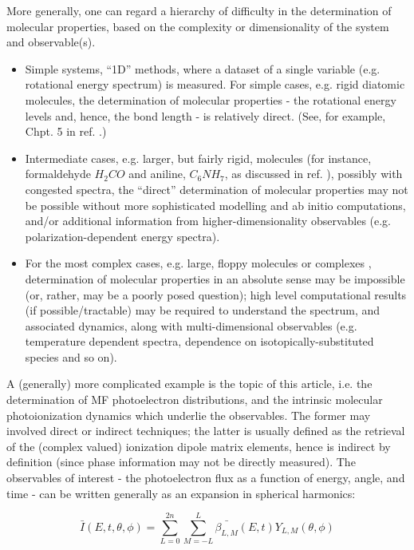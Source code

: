
More generally, one can regard a hierarchy of difficulty in the determination of molecular properties, based on the complexity or dimensionality of the system and observable(s).
\begin{itemize}
\item Simple systems, ``1D” methods, where a dataset of a single variable (e.g. rotational energy spectrum) is measured. For simple cases, e.g. rigid diatomic molecules, the determination of molecular properties - the rotational energy levels and, hence, the bond length - is relatively direct. (See, for example, Chpt. 5 in ref. \cite{hollasHighRes}.) %
\item Intermediate cases, e.g. larger, but fairly rigid, molecules (for instance, formaldehyde $H_2CO$ and aniline, $C_6NH_7$, as discussed in ref. \cite{hollasHighRes}), possibly with congested spectra, the ``direct” determination of molecular properties may not be possible without more sophisticated modelling and ab initio computations, and/or additional information from higher-dimensionality observables (e.g. polarization-dependent energy spectra).
\item For the most complex cases, e.g. large, floppy molecules or complexes \cite{bunkerMolSymm,schmiedt2015SymmetryExtremelyFloppy}, determination of molecular properties in an absolute sense may be impossible (or, rather, may be a poorly posed question); high level computational results (if possible/tractable) may be required to understand the spectrum, and associated dynamics, along with multi-dimensional observables (e.g. temperature dependent spectra, dependence on isotopically-substituted species and so on).
\end{itemize}    

A (generally) more complicated example is the topic of this article, i.e. the determination of MF photoelectron distributions, and the intrinsic molecular photoionization dynamics which underlie the observables.  The former may involved direct or indirect techniques; the latter is usually defined as the retrieval of the (complex valued) ionization dipole matrix elements, hence is indirect by definition (since phase information may not be directly measured). The observables of interest - the photoelectron flux as a function of energy, angle, and time - can be written generally as an expansion in spherical harmonics:

\begin{equation}
\bar{I}(E,t,\theta,\phi)=\sum_{L=0}^{2n}\sum_{M=-L}^{L}\bar{\beta_{L,M}}(E,t)Y_{L,M}(\theta,\phi)\label{eq:AF-PAD-general}
\end{equation}

